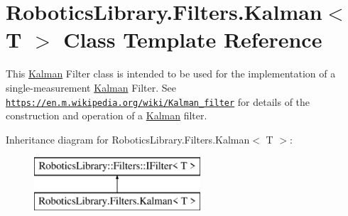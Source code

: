 \hypertarget{class_robotics_library_1_1_filters_1_1_kalman}{}\section{Robotics\+Library.\+Filters.\+Kalman$<$ T $>$ Class Template Reference}
\label{class_robotics_library_1_1_filters_1_1_kalman}


This \hyperlink{class_robotics_library_1_1_filters_1_1_kalman}{Kalman} Filter class is intended to be used for the implementation of a single-\/measurement \hyperlink{class_robotics_library_1_1_filters_1_1_kalman}{Kalman} Filter. See \href{https://en.m.wikipedia.org/wiki/Kalman_filter}{\tt https\+://en.\+m.\+wikipedia.\+org/wiki/\+Kalman\+\_\+filter} for details of the construction and operation of a \hyperlink{class_robotics_library_1_1_filters_1_1_kalman}{Kalman} filter. 


Inheritance diagram for Robotics\+Library.\+Filters.\+Kalman$<$ T $>$\+:\begin{figure}[H]
\begin{center}
\leavevmode
\includegraphics[height=2.000000cm]{class_robotics_library_1_1_filters_1_1_kalman}
\end{center}
\end{figure}
